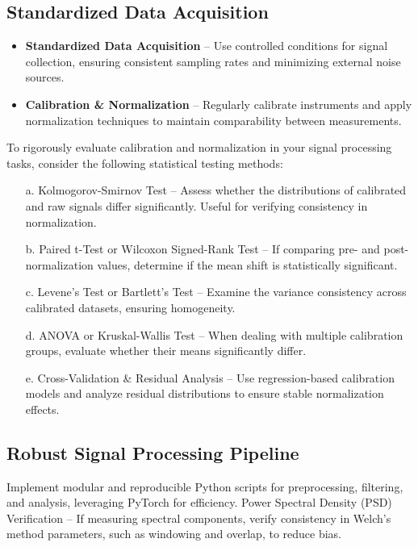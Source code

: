 \documentclass[10pt]{report}
\begin{document}
\subsection*{Standardized Data Acquisition}

\begin{itemize}
 \item \textbf{Standardized Data Acquisition} – Use controlled conditions for signal collection, ensuring consistent sampling rates and minimizing external noise sources.
 \item \textbf{Calibration \& Normalization} – Regularly calibrate instruments and apply normalization techniques to maintain comparability between measurements.
\end{itemize}

To rigorously evaluate calibration and normalization in your signal processing tasks, consider the following statistical testing methods:

\begin{itemize}
 \item[a.] Kolmogorov-Smirnov Test – Assess whether the distributions of calibrated and raw signals differ significantly. Useful for verifying consistency in normalization.
 \item[b.] Paired t-Test or Wilcoxon Signed-Rank Test – If comparing pre- and post-normalization values, determine if the mean shift is statistically significant.
 \item[c.] Levene’s Test or Bartlett’s Test – Examine the variance consistency across calibrated datasets, ensuring homogeneity.
 \item[d.] ANOVA or Kruskal-Wallis Test – When dealing with multiple calibration groups, evaluate whether their means significantly differ.
 \item[e.] Cross-Validation \& Residual Analysis – Use regression-based calibration models and analyze residual distributions to ensure stable normalization effects.
\end{itemize}

\subsection*{Robust Signal Processing Pipeline}

Implement modular and reproducible Python scripts for preprocessing, filtering, and analysis, leveraging PyTorch for efficiency. Power Spectral Density (PSD) Verification – If measuring spectral components, verify consistency in Welch’s method parameters, such as windowing and overlap, to reduce bias.
\end{document}
